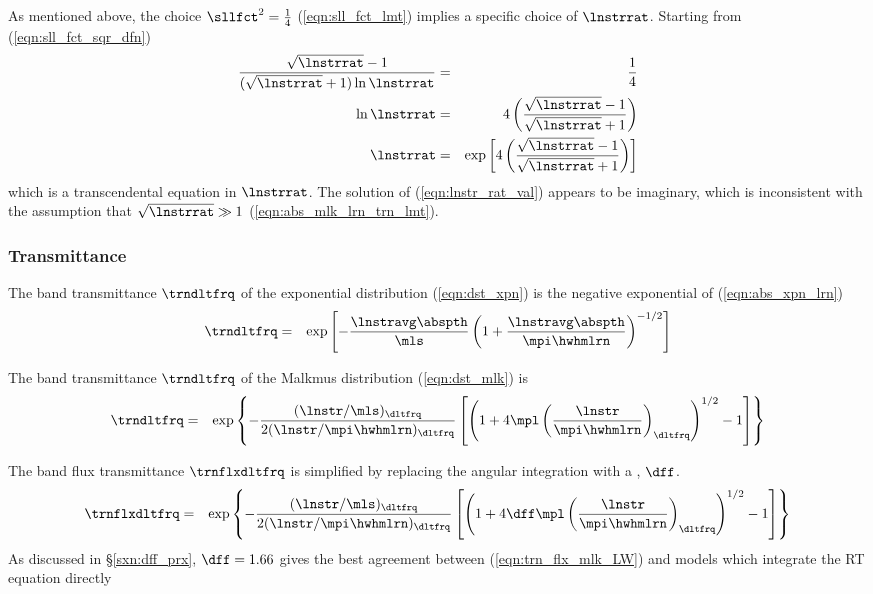\documentclass[12pt]{article}
\begin{document}
As mentioned above, the choice $\sllfct^{2} = \frac{1}{4}$
(\ref{eqn:sll_fct_lmt}) implies a specific choice of $\lnstrrat$.
Starting from (\ref{eqn:sll_fct_sqr_dfn})
\begin{eqnarray}
\frac{\sqrt{\lnstrrat} - 1}{(\sqrt{\lnstrrat} + 1) \ln \lnstrrat}
& = & \frac{1}{4} \nonumber \\
\ln \lnstrrat & = & 4 \left( \frac{\sqrt{\lnstrrat} - 1}
{\sqrt{\lnstrrat} + 1} \right )
\nonumber \\
\lnstrrat & = &
\exp \left[ 4 \left( \frac{\sqrt{\lnstrrat}-1}{\sqrt{\lnstrrat}+1}
\right) \right]
\label{eqn:lnstr_rat_val}
\end{eqnarray}
which is a transcendental equation in $\lnstrrat$.
The solution of (\ref{eqn:lnstr_rat_val}) appears to be imaginary,
which is inconsistent with the assumption that 
$\sqrt{\lnstrrat} \gg 1$ (\ref{eqn:abs_mlk_lrn_trn_lmt}).

\subsubsection[Transmittance]{Transmittance}\label{sxn:lnstr_dst_trn}
The band transmittance $\trndltfrq$ of the exponential distribution
(\ref{eqn:dst_xpn}) is the negative exponential of
(\ref{eqn:abs_xpn_lrn}) 
\begin{eqnarray}
\trndltfrq & = & \exp \left[ - 
\frac{\lnstravg \abspth}{\mls}
\left(1 + \frac{\lnstravg \abspth}{\mpi \hwhmlrn} \right)^{-1/2}
\right]
\label{eqn:trn_xpn_lrn}
\end{eqnarray}

The band transmittance $\trndltfrq$ of the Malkmus distribution
(\ref{eqn:dst_mlk}) is 
\begin{eqnarray}
\trndltfrq & = & \exp \left\{ - \frac{ ( \lnstr / \mls )_{\dltfrq}}{2 ( \lnstr
/ \mpi \hwhmlrn )_{\dltfrq} } \left[ \left( 1 + 4 \mpl \left( \frac{\lnstr
}{\mpi \hwhmlrn} \right)_{\dltfrq} \right)^{1/2} - 1 \right] \right\} 
\label{eqn:trn_mlk_lrn}
\end{eqnarray}

The band flux transmittance $\trnflxdltfrq$ 
is simplified by replacing the angular integration with a
, $\dff$.  
\begin{eqnarray}
\trnflxdltfrq & = & \exp \left\{ - \frac{ ( \lnstr / \mls )_{\dltfrq}}{2 ( \lnstr
/ \mpi \hwhmlrn )_{\dltfrq} } \left[ \left( 1 + 4 \dff \mpl \left( \frac{\lnstr
}{\mpi \hwhmlrn} \right)_{\dltfrq} \right)^{1/2} - 1 \right] \right\} 
\label{eqn:trn_flx_mlk_LW}
\end{eqnarray}
As discussed in \S\ref{sxn:dff_prx}, $\dff = 1.66$ gives the
best agreement between (\ref{eqn:trn_flx_mlk_LW}) and models which
integrate the RT equation directly %
\end{document}
